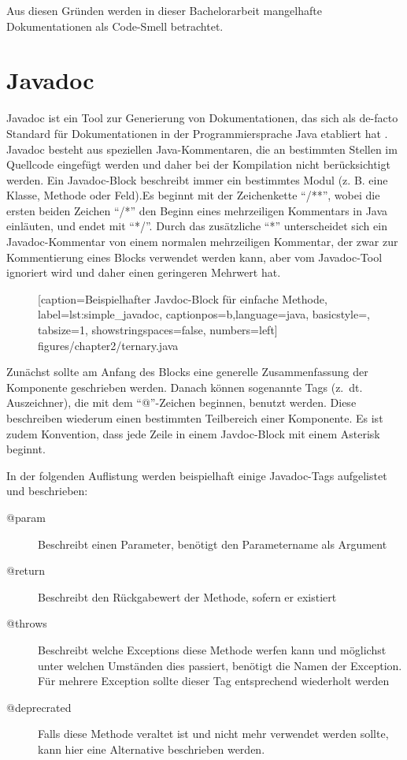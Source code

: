 Aus diesen Gründen werden in dieser Bachelorarbeit mangelhafte Dokumentationen als Code-Smell betrachtet.

\section{Javadoc}\label{chapter:javadoc}
Javadoc \cite{HowtoWriteDocCommentsfortheJavadocTool} ist ein Tool zur Generierung von Dokumentationen, das sich als de-facto Standard für Dokumentationen in der Programmiersprache Java etabliert hat \cite[S. 249]{JavadocViolationsandTheirEvolutioninOpen-SourceSoftware}.  Javadoc besteht aus speziellen Java-Kommentaren, die an bestimmten Stellen im Quellcode eingefügt werden und daher bei der Kompilation nicht berücksichtigt werden. Ein Javadoc-Block beschreibt immer ein bestimmtes Modul (z. B. eine Klasse, Methode oder Feld).Es beginnt mit der Zeichenkette \enquote{/**}, wobei die ersten beiden Zeichen \enquote{/*} den Beginn eines mehrzeiligen Kommentars in Java einläuten, und endet mit \enquote{*/}. Durch das zusätzliche \enquote{*} unterscheidet sich ein Javadoc-Kommentar von einem normalen mehrzeiligen Kommentar, der zwar zur Kommentierung eines Blocks verwendet werden kann, aber vom Javadoc-Tool ignoriert wird und daher einen geringeren Mehrwert hat.
		\begin{figure}[ht!]
			
			[caption={Beispielhafter Javdoc-Block für einfache Methode},
			label={lst:simple_javadoc},
			captionpos=b,language=java, basicstyle=\footnotesize, tabsize=1, showstringspaces=false,  numbers=left]
			{figures/chapter2/ternary.java}
		\end{figure}
Zunächst sollte am Anfang des Blocks eine generelle Zusammenfassung der Komponente geschrieben werden. Danach können sogenannte Tags (z.~dt. Auszeichner), die mit dem \enquote{@}-Zeichen beginnen, benutzt werden. Diese beschreiben wiederum einen bestimmten Teilbereich einer Komponente. Es ist zudem Konvention, dass jede Zeile in einem Javdoc-Block mit einem Asterisk beginnt. 

In der folgenden Auflistung werden beispielhaft einige Javadoc-Tags aufgelistet und beschrieben:
\begin{description}
         \item[@param]  Beschreibt einen Parameter, benötigt den Parametername als Argument
         \item[@return]  Beschreibt den Rückgabewert der Methode, sofern er existiert 
         \item[@throws] Beschreibt welche Exceptions diese Methode werfen kann und möglichst unter welchen Umständen dies passiert, benötigt die Namen der Exception. Für mehrere Exception sollte dieser Tag entsprechend wiederholt werden 
         \item[@deprecrated] Falls diese Methode veraltet ist und nicht mehr verwendet werden sollte, kann hier eine Alternative beschrieben werden. 
        
\end{description}

